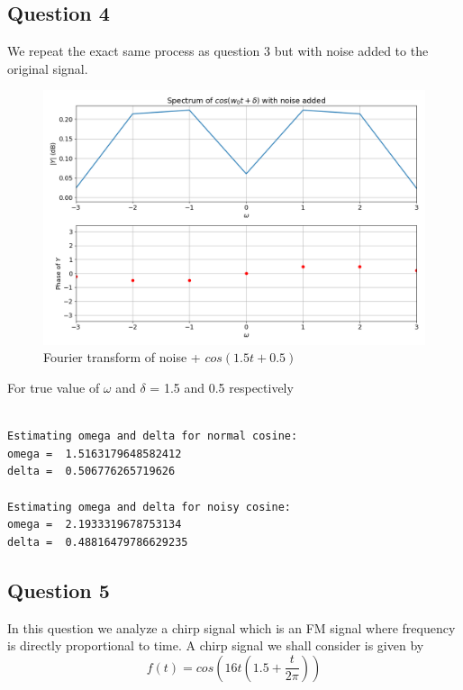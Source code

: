 \documentclass{article}
\begin{document}
\subsection{Question 4}

We repeat the exact same process as question 3 but with noise added to the original signal.

\begin{figure}[!tbh]
\centering
\includegraphics[scale=0.4]{plots/noisy_cosine.png}
\caption{Fourier transform of noise + $cos(1.5t+0.5)$}
\label{fig:11}
\end{figure}

\noindent
For true value of $\omega$ and $\delta$ = 1.5 and 0.5 respectively 

\begin{verbatim}

Estimating omega and delta for normal cosine: 
omega =  1.5163179648582412
delta =  0.506776265719626

Estimating omega and delta for noisy cosine: 
omega =  2.1933319678753134
delta =  0.48816479786629235

\end{verbatim}
    
\subsection{Question 5}
In this question we analyze a chirp signal which is an FM signal where frequency is directly proportional to time.
A chirp signal we shall consider is given by 
\begin{equation}
    f(t) = cos(16t(1.5 + \frac{t}{2\pi}))
\end{equation}
\end{document}
